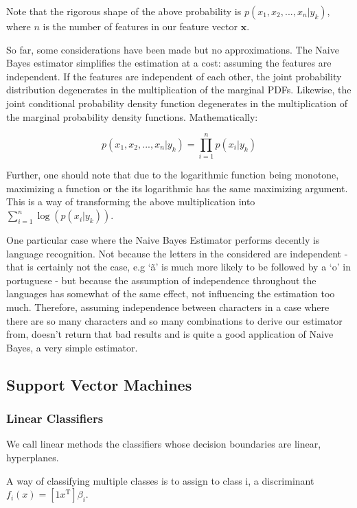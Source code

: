 Note that the rigorous shape of the above probability is $p(x_1, x_2, ..., x_n|y_k)$, where $n$ is the number of features in our feature vector $\mathbf{x}$.

So far, some considerations have been made but no approximations. The Naive Bayes estimator simplifies the estimation at a cost: assuming the features are independent. If the features are independent of each other, the joint probability distribution degenerates in the multiplication of the marginal PDFs. Likewise, the joint conditional probability density function degenerates in the multiplication of the marginal probability density functions. Mathematically:


\begin{equation}
    p(x_1, x_2, ..., x_n|y_k) = \prod_{i=1}^{n} p(x_i|y_k)
\end{equation}

Further, one should note that due to the logarithmic function being monotone, maximizing a function or the its logarithmic has the same maximizing argument. This is a way of transforming the above multiplication into $\sum_{i=1}^{n}\log(p(x_i|y_k))$.

One particular case where the Naive Bayes Estimator performs decently is language recognition. Not because the letters in the  considered are independent - that is certainly not the case, e.g `ã' is much more likely to be followed by a `o' in portuguese - but because the assumption of independence throughout the languages has somewhat of the same effect, not influencing the estimation too much. Therefore, assuming independence between characters in a case where there are so many characters and so many  combinations to derive our estimator from, doesn't return that bad results and is quite a good application of Naive Bayes, a very simple estimator.


\subsection{Support Vector Machines}


\subsubsection{Linear Classifiers}
We call linear methods the classifiers whose decision boundaries are linear, hyperplanes.

A way of classifying multiple classes is to assign to class i, a discriminant $f_i(x) = \left[1 x^\text{T}\right] \beta_i$.

